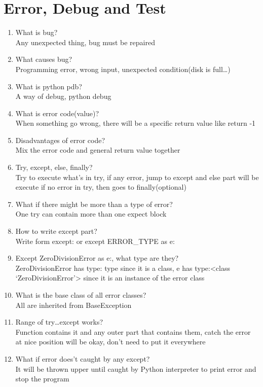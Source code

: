 \documentclass[10pt,a4paper,oneside]{article}
\begin{document}
\section{Error, Debug and Test}
\begin{enumerate}[1.]
\item What is bug?\\
Any unexpected thing, bug must be repaired
\item What causes bug?\\
Programming error, wrong input, unexpected condition(disk is full\dots)
\item What is python pdb?\\
A way of debug, python debug
\item What is error code(value)?\\
When something go wrong, there will be a specific return value like return -1
\item Disadvantages of error code?\\
Mix the error code and general return value together
\item Try, except, else, finally?\\
Try to execute what’s in try, if any error, jump to except and else part will be execute if no error in try, then goes to finally(optional)
\item What if there might be more than a type of error?\\
One try can contain more than one expect block
\item How to write except part?\\
Write form except: or except ERROR\_TYPE as e:
\item Except ZeroDivisionError as e:, what type are they?\\
ZeroDivisionError has type: type since it is a class, e has type:<class `ZeroDivisionError'> since it is an instance of the error class
\item What is the base class of all error classes?\\
All are inherited from BaseException
\item Range of try\dots except works?\\
Function contains it and any outer part that contains them, catch the error at nice position will be okay, don't need to put it everywhere
\item What if error does't caught by any except?\\
It will be thrown upper until caught by Python interpreter to print error and stop the program

\end{enumerate}
\end{document}
